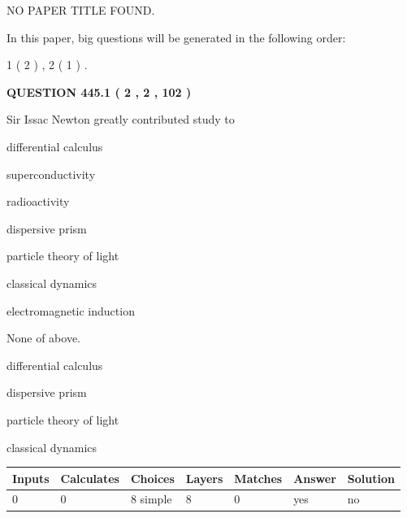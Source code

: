 \documentclass[12pt]{article}
\begin{document}
   
\vspace{0.2in}
   
   
   
   
   
   
 NO PAPER TITLE FOUND.
   
   
   
\vspace{0.2in}
   
In this paper, big questions will be generated in the following order: 
   
   
   1 ( 2 )
 ,
   2 ( 1 )
 .
  
\vspace{0.2in}
  
{\textbf{\Large{QUESTION
445.1 
 ( 2 , 2 , 102 )
}}}
  
  
Sir Issac Newton greatly contributed study to
 
 
differential calculus
 
 
superconductivity
 
 
radioactivity
 
 
dispersive prism
 
 
particle theory of light
 
 
classical dynamics
 
 
electromagnetic induction
 
 
 None of above.
 
 
\noindent{}
 
 
differential calculus
 
 
dispersive prism
 
 
particle theory of light
 
 
classical dynamics
 
 
\noindent{}
 
 
   
   
   
   
\noindent\begin{tabular}{|l|l|l|l|l|l|l|}
 \hline
Inputs & Calculates & Choices & Layers & Matches & Answer & Solution \\ \hline
 0  & 
 0  & 
 8
  simple  
  & 
 8  & 
 0  & 
  yes & 
  no 
  \\ \hline
 \end{tabular}
   
\end{document}
